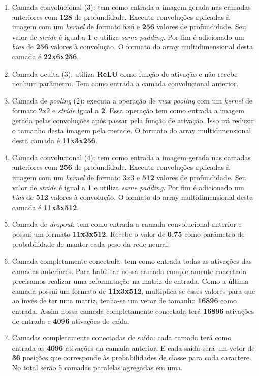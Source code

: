 \begin{enumerate}
\item Camada convolucional (3): tem como entrada a imagem gerada
  nas camadas anteriores com {\bf 128} de profundidade. Executa
  convoluções aplicadas à imagem com um \textit{kernel} de formato
  $5x5$ e {\bf 256} valores de profundidade. Seu valor de
  \textit{stride} é igual a {\bf 1} e utiliza \textit{same
    padding}. Por fim é adicionado um \textit{bias} de {\bf 256}
  valores à convolução. O formato do array multidimensional desta
  camada é {\bf 22x6x256}.

\item Camada oculta (3): utiliza {\bf ReLU} como função de ativação e
  não recebe nenhum parâmetro. Tem como entrada a camada convolucional
  anterior.

\item Camada de \textit{pooling} (2): executa a operação de
  \textit{max pooling} com um \textit{kernel} de formato $2x2$ e
  \textit{stride} igual a {\bf 2}. Essa operação tem como entrada a
  imagem gerada pelas convoluções após passar pela função de
  ativação. Isso irá reduzir o tamanho desta imagem pela metade. O
  formato do array multidimensional desta camada é {\bf 11x3x256}.

\item Camada convolucional (4): tem como entrada a imagem gerada
  nas camadas anteriores com {\bf 256} de profundidade. Executa
  convoluções aplicadas à imagem com um \textit{kernel} de formato
  $3x3$ e {\bf 512} valores de profundidade. Seu valor de
  \textit{stride} é igual a {\bf 1} e utiliza \textit{same
    padding}. Por fim é adicionado um \textit{bias} de {\bf 512}
  valores à convolução. O formato do array multidimensional desta
  camada é {\bf 11x3x512}.

\item Camada de \textit{dropout}: tem como entrada a camada
  convolucional anterior e possui um formato {\bf 11x3x512}. Recebe o
  valor de {\bf 0.75} como parâmetro de probabilidade de manter cada
  peso da rede neural.

\item Camada completamente conectada: tem como entrada todas as
  ativações das camadas anteriores. Para habilitar nossa camada
  completamente conectada precisamos realizar uma reformatação na
  matriz de entrada. Como a última camada possui um formato de {\bf
    11x3x512}, multiplica-se esses valores para que ao invés de
  ter uma matriz, tenha-se um vetor de tamanho {\bf 16896} como
  entrada. Assim nossa camada completamente conectada terá {\bf 16896}
  ativações de entrada e {\bf 4096} ativações de saída.

\item Camadas completamente conectadas de saída: cada camada terá como
  entrada as {\bf 4096} ativações da camada anterior. E cada saída
  será um vetor de {\bf 36} posições que corresponde às probabilidades
  de classe para cada caractere. No total serão 5 camadas paralelas
  agregadas em uma.

\end{enumerate}

